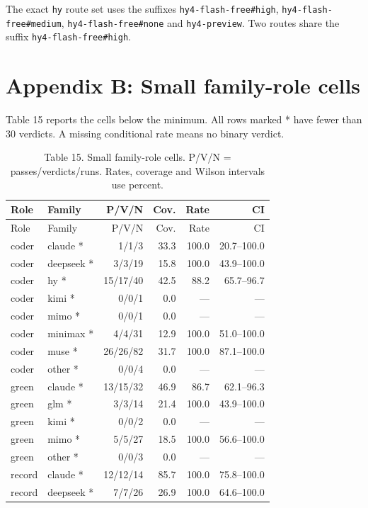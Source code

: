 \documentclass[
  10pt,
  a4paper,
]{article}
\begin{document}
The exact \texttt{hy} route set uses the suffixes
\texttt{hy4-flash-free\#high}, \texttt{hy4-flash-free\#medium},
\texttt{hy4-flash-free\#none} and \texttt{hy4-preview}. Two routes share
the suffix \texttt{hy4-flash-free\#high}.

\section{Appendix B: Small family-role
cells}\label{appendix-b-small-family-role-cells}

Table 15 reports the cells below the minimum. All rows marked * have
fewer than 30 verdicts. A missing conditional rate means no binary
verdict.

\begin{longtable}[]{@{}llrrrr@{}}
\caption{Table 15. Small family-role cells. P/V/N =
passes/verdicts/runs. Rates, coverage and Wilson intervals use
percent.}\tabularnewline
\toprule\noalign{}
Role & Family & P/V/N & Cov. & Rate & CI \\
\midrule\noalign{}
\endfirsthead
\toprule\noalign{}
Role & Family & P/V/N & Cov. & Rate & CI \\
\midrule\noalign{}
\endhead
\bottomrule\noalign{}
\endlastfoot
coder & claude * & 1/1/3 & 33.3 & 100.0 & 20.7--100.0 \\
coder & deepseek * & 3/3/19 & 15.8 & 100.0 & 43.9--100.0 \\
coder & hy * & 15/17/40 & 42.5 & 88.2 & 65.7--96.7 \\
coder & kimi * & 0/0/1 & 0.0 & --- & --- \\
coder & mimo * & 0/0/1 & 0.0 & --- & --- \\
coder & minimax * & 4/4/31 & 12.9 & 100.0 & 51.0--100.0 \\
coder & muse * & 26/26/82 & 31.7 & 100.0 & 87.1--100.0 \\
coder & other * & 0/0/4 & 0.0 & --- & --- \\
green & claude * & 13/15/32 & 46.9 & 86.7 & 62.1--96.3 \\
green & glm * & 3/3/14 & 21.4 & 100.0 & 43.9--100.0 \\
green & kimi * & 0/0/2 & 0.0 & --- & --- \\
green & mimo * & 5/5/27 & 18.5 & 100.0 & 56.6--100.0 \\
green & other * & 0/0/3 & 0.0 & --- & --- \\
record & claude * & 12/12/14 & 85.7 & 100.0 & 75.8--100.0 \\
record & deepseek * & 7/7/26 & 26.9 & 100.0 & 64.6--100.0 \\

\end{longtable}
\end{document}
